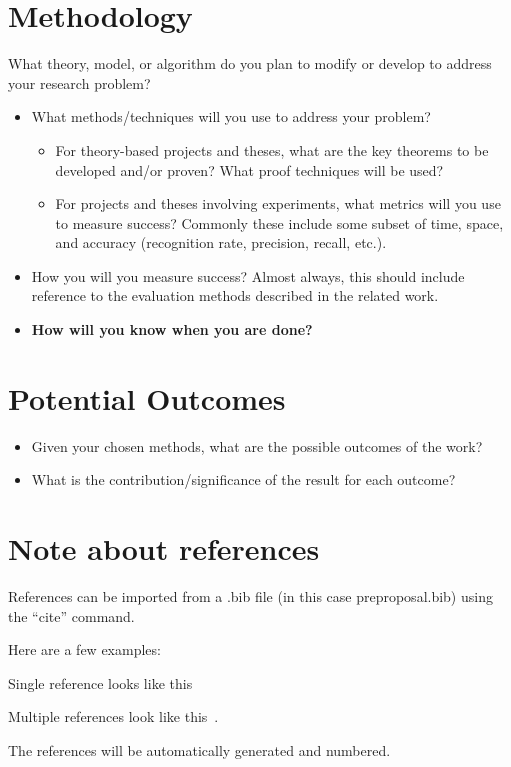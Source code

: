 \documentclass[11pt]{artikel3}
\begin{document}
\section{Methodology}

What theory, model, or algorithm do you plan to modify or develop to address your research problem?
\begin{itemize}
\item What methods/techniques will you use to address your problem? 
\begin{itemize}
\item For theory-based projects and theses, what are the key theorems to be developed and/or proven? What proof techniques will be used?
\item For projects and theses involving experiments, what metrics
will you use to measure success? Commonly these include some subset of time, space, and accuracy (recognition rate, precision, recall, etc.).
\end{itemize}

\item How you will you measure success? Almost always, this should include reference to the evaluation methods described in the related work.

\item {\bf How will you know when you are done?}
\end{itemize}

\section{Potential Outcomes}

\begin{itemize}
\item Given your chosen methods, what are the possible outcomes of the work? 
\item What is the contribution/significance of the result for each outcome? 
\end{itemize}

\section*{Note about references}

References can be imported from a .bib file (in this case preproposal.bib) using the ``cite'' command. 

Here are a few examples: 

Single reference looks like this~\cite{collab}

Multiple references look like this~\cite{auctions, segmentation}.

The references will be automatically generated and numbered.



\end{document}
